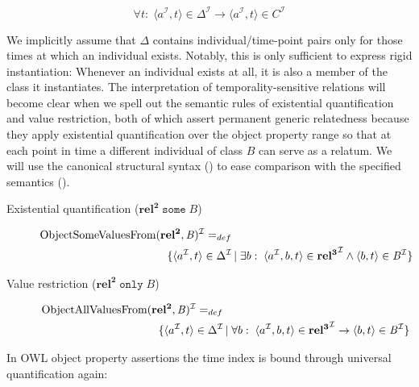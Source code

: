 \documentclass[10pt]{bmc_article}
\newcommand{\mirel}[1]{\ensuremath{\mathrm{\mathbf{#1}}}}
\newcommand{\mclass}[1]{\ensuremath{\mathit{#1}}}
\newcommand{\mrel}[2]{\mirel{#1^#2}}
\newcommand{\mrelb}[1]{\mrel{#1}{2}}
\newcommand{\mrelt}[1]{\mrel{#1}{3}}
\newcommand{\dlint}[1]{\ensuremath{#1^{\mathcal{I}}}}
\newcommand{\pair}[2]{\ensuremath{\langle #1,#2\rangle}}
\newenvironment{bmcformat}{\baselineskip20pt\sloppy\setboolean{publ}{false}}{\baselineskip20pt\sloppy}
\begin{document}
\begin{bmcformat}
\begin{equation}
\forall t:\;\pair{\dlint{a}}{t}\in \dlint{\Delta} \rightarrow
\pair{\dlint{a}}{t} \in \dlint{\mclass{C}}
\end{equation}

We implicitly assume that $\Delta$ contains individual/time-point pairs only for
those times at which an individual exists. Notably, this is only sufficient to express rigid instantiation: Whenever an individual exists at
all, it is also a member of the class it instantiates. The interpretation of
temporality-sensitive relations will become clear when we spell out the semantic
rules of existential quantification and value restriction, both of which assert
permanent generic relatedness because they apply existential quantification over the
object property range so that at each point in time a different individual of
class \mclass{B} can serve as a relatum. We will use the canonical structural syntax
(\cite{OWL2:structural})
to ease comparison with the specified semantics (\cite{OWL2:direct}).

\begin{description}
\item[Existential quantification ($\mrelb{rel}\;\mathtt{some}\;\mclass{B}$)]
\begin{equation}
\begin{split}
\dlint{\text{ObjectSomeValuesFrom}&(\mrelb{rel},\mclass{B})} =_{def}\\ &\quad
\{\pair{\dlint{a}}{t}\in \dlint{\Delta}\,|\; \exists b:\;\langle\dlint{a},b,t\rangle
\in \dlint{\mrelt{rel}} \wedge \pair{b}{t} \in \dlint{\mclass{B}}\}
\end{split}
\end{equation} 
\item[Value restriction ($\mrelb{rel}\;\mathtt{only}\;\mclass{B}$)]
\begin{equation}
\begin{split}
\dlint{\text{ObjectAllValuesFrom}&(\mrelb{rel},\mclass{B})} =_{def}\\ &\quad
\{\pair{\dlint{a}}{t}\in \dlint{\Delta}\,|\; \forall b:\;\langle\dlint{a},b,t\rangle
\in \dlint{\mrelt{rel}} \rightarrow \pair{b}{t} \in \dlint{\mclass{B}}\}
\end{split}
\end{equation}
\end{description}

In OWL object property assertions the time index is bound through universal
quantification again:


\end{bmcformat}
\end{document}
